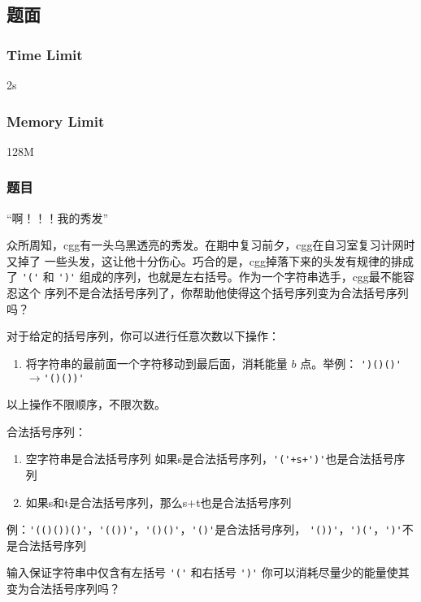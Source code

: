 \subsection{题面}

\subsubsection{Time Limit}
2s

\subsubsection{Memory Limit}
128M

\subsubsection{题目}
“啊！！！我的秀发”

众所周知，cgg有一头乌黑透亮的秀发。在期中复习前夕，cgg在自习室复习计网时又掉了
一些头发，这让他十分伤心。巧合的是，cgg掉落下来的头发有规律的排成了 \verb|'('| 
和 \verb|')'| 组成的序列，也就是左右括号。作为一个字符串选手，cgg最不能容忍这个
序列不是合法括号序列了，你帮助他使得这个括号序列变为合法括号序列吗？

对于给定的括号序列，你可以进行任意次数以下操作：
\begin{enumerate}
\itme 删除字符串中任意一个字符，消耗能量 $a$ 点。举例：\verb|'())'|$\to$\verb|'()'|
\item 将字符串的最前面一个字符移动到最后面，消耗能量 $b$ 点。举例：
    \verb|')()()'|$\to$\verb|'()())'|
\end{enumerate}

以上操作不限顺序，不限次数。

合法括号序列：
\begin{enumerate}
    \item 空字符串是合法括号序列
    \itme 如果s是合法括号序列，\verb|'('+s+')'|也是合法括号序列
    \item 如果s和t是合法括号序列，那么s+t也是合法括号序列
\end{enumerate}
例：\verb|'(()())()'|，\verb|'(())'|，\verb|'()()'|，\verb|'()'|是合法括号序列，
\verb|'())'|，\verb|')('|，\verb|')'|不是合法括号序列

输入保证字符串中仅含有左括号 \verb|'('| 和右括号 \verb|')'|
你可以消耗尽量少的能量使其变为合法括号序列吗？

